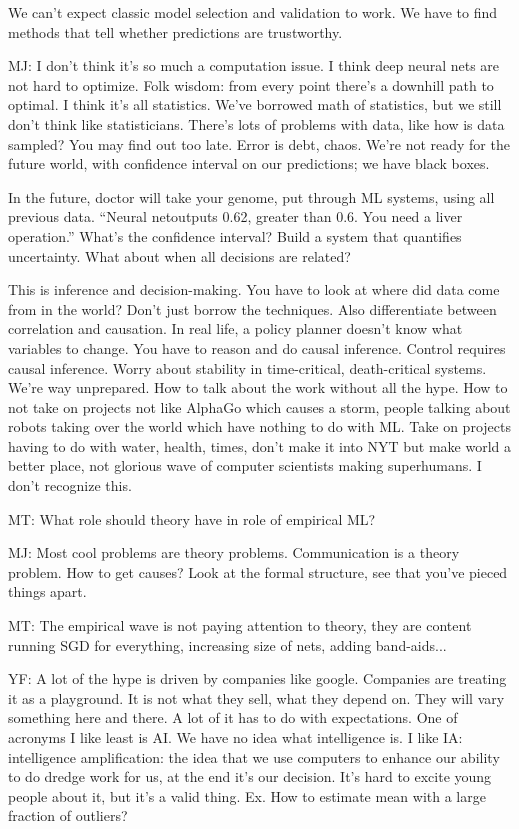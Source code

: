 We can't expect classic model selection and validation to work. We have to find methods that tell whether predictions are trustworthy.

MJ: I don't think it's so much a computation issue. I think deep neural nets are not hard to optimize. Folk wisdom: from every point there's a downhill path to optimal. I think it's all statistics. We've borrowed math of statistics, but we still don't think like statisticians. There's lots of problems with data, like how is data sampled?  You may find out too late. Error is debt, chaos. We're not ready for the future world, with confidence interval on our predictions; we have black boxes. 

In the future, doctor will take your genome, put through ML systems, using all previous data. ``Neural netoutputs 0.62, greater than 0.6. You need a liver operation.'' What's the confidence interval? Build a system that quantifies uncertainty. What about when all decisions are related? 

This is inference and decision-making. %
You have to look at where did data come from in the world? Don't just borrow the techniques. 
Also differentiate between correlation and causation. In real life, a policy planner doesn't know what variables to change. You have to reason and do causal inference. Control requires causal inference. Worry about stability in  time-critical, death-critical systems. We're way unprepared. How to talk about the work without all the hype. How to not take on projects not like AlphaGo which causes a storm, people talking about robots taking over the world which have nothing to do with ML. Take on projects having to do with water, health, times, don't make it into NYT but make world a better place, not glorious wave of computer scientists making superhumans. I don't recognize this. 

MT: What role should theory have in role of empirical ML?

MJ: Most cool problems are theory problems. Communication is a theory problem. How to get causes?  Look at the formal structure, see that you've pieced things apart. 

MT: The empirical wave is not paying attention to theory, they are content running SGD for everything, increasing size of nets, adding band-aids...

YF: A lot of the hype is driven by companies like google. Companies are treating it as a playground. It is not what they sell, what they depend on. They will vary something here and there. A lot of it has to do with expectations. One of acronyms I like least is AI. We have no idea what intelligence is. I like IA: intelligence amplification: the idea that we use computers to enhance our ability to do dredge work for us, at the end it's our decision. It's hard to excite young people about it, but it's a valid thing. Ex.  How to estimate mean with a large fraction of outliers?

